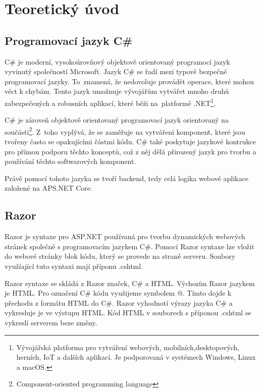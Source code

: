 \documentclass[a4paper, 12pt]{report}
\begin{document}
	\chapter{Teoretický úvod}
		\section{Programovací jazyk C\#}
        C\# je moderní, vysokoúrovňový objektově orientovaný programocí jazyk vyvinutý společností Microsoft. Jazyk C\# se řadí mezi typově bezpečné programovací jazyky. To~znamená, že nedovoluje provádět operace, které mohou véct k chybám. Tento jazyk umožnuje vývojářům vytvářet mnoho druhů zabezpečených a robusních aplikací, které běži na~platformě .NET\footnote{Vývojářská platforma pro vytváření webových, mobilních,desktopových, herních, IoT a dalších aplikací. Je podporovaná v systémech Windows, Linux a macOS.}.\par
        C\# je zároveň objektově orientovaný programovací jazyk orientovaný na součásti\footnote{Component-oriented programming language}. Z~toho vyplývá, že se zaměřuje na vytváření komponent, které jsou tvořeny často se opakujícími částmi kódu. C\# také poskytuje jazykové kontrukce pro přímou podporu těchto konceptů, což z něj dělá přirozený jazyk pro tvorbu a používání těchto softwarových komponent.\cite{CSharp}\par
		Právě pomocí tohoto jazyka se tvoří backend, tedy celá logika webové aplikace založené na APS.NET Core.
		\section{Razor}
		Razor je syntaxe pro ASP.NET používaná pro tvorbu dynamických webových stránek společně s programovacím jazykem C\#. Pomocí Razor syntaxe lze vložit do webové stránky blok kódu, který se provede na straně serveru. Soubory využíající tuto syntaxi mají příponu .cshtml.\par
		Razor syntaxe se skládá z Razor značek, C\# a HTML. Výchozím Razor jazykem je HTML. Pro označení C\# kódu využijeme symbolem @. Tímto dojde k přechodu z formátu HTML do C\#. Razor vyhodnotí výrazy jazyka C\# a vykresluje je ve výstupu HTML. Kód HTML v souborech s příponou .cshtml se vykreslí serverem beze změny.\cite{Razor}
\end{document}
